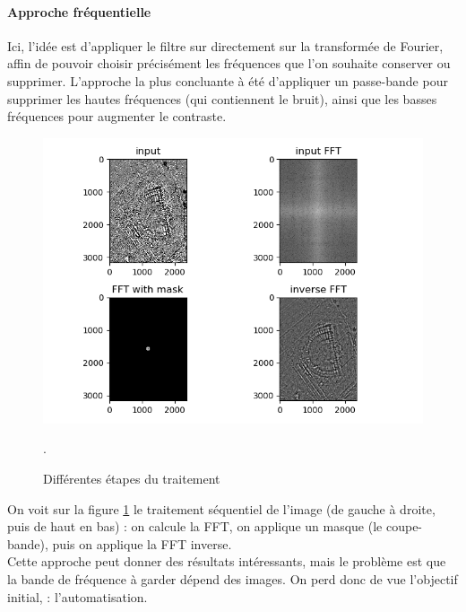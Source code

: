 \documentclass[a4paper, 12pt, titlepage, oneside, french]{article}
\begin{document}
	\newpage
	\paragraph{\textbf{Approche fréquentielle}}
	Ici, l'idée est d'appliquer le filtre sur directement sur la transformée de Fourier, affin de pouvoir choisir précisément les fréquences que l'on souhaite conserver ou supprimer.
	L'approche la plus concluante à été d'appliquer un passe-bande pour supprimer les hautes fréquences (qui contiennent le bruit), ainsi que les basses fréquences pour augmenter le contraste.
	\begin{figure}[H]
		\centering
		\includegraphics[width=\linewidth]{filter_fft.png}
		\caption{Différentes étapes du traitement}. 
		\label{fig:FilterFFT}
	\end{figure}
	On voit sur la figure \ref{fig:FilterFFT} le traitement séquentiel de l'image (de gauche à droite, puis de haut en bas) : on calcule la FFT, on applique un masque (le coupe-bande), puis on applique la FFT inverse. \\
	Cette approche peut donner des résultats intéressants, mais le problème est que la bande de fréquence à garder dépend des images. On perd donc de vue l'objectif initial, : l'automatisation.

	\newpage
\end{document}
